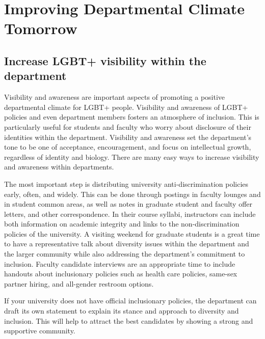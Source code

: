 %

\chapter{Improving Departmental Climate Tomorrow}	%
\label{climate-tomorrow}		%
\normalsize			%


\section {Increase LGBT+ visibility within the department}
\label{visibility}
Visibility and awareness are important aspects of promoting a positive departmental climate for LGBT+ people. Visibility and awareness of LGBT+ policies and even department members fosters an atmosphere of inclusion. This is particularly useful for students and faculty who worry about disclosure of their identities within the department. Visibility and awareness set the department's tone to be one of acceptance, encouragement, and focus on intellectual growth, regardless of identity and biology. There are many easy ways to increase visibility and awareness within departments.

The most important step is distributing university anti-discrimination policies early, often, and widely. This can be done through postings in faculty lounges and in student common areas, as well as notes in graduate student and faculty offer letters, and other correspondence. In their course syllabi, instructors can include both information on academic integrity and links to the non-discrimination policies of the university. A visiting weekend for graduate students is a great time to have a representative talk about diversity issues within the department and the larger community while also addressing the department's commitment to inclusion. Faculty candidate interviews are an appropriate time to include handouts about inclusionary policies such as health care policies, same-sex partner hiring, and all-gender restroom options.

If your university does not have official inclusionary policies, the department can draft its own statement to explain its stance and approach to diversity and inclusion. This will help to attract the best candidates by showing a strong and supportive community.


